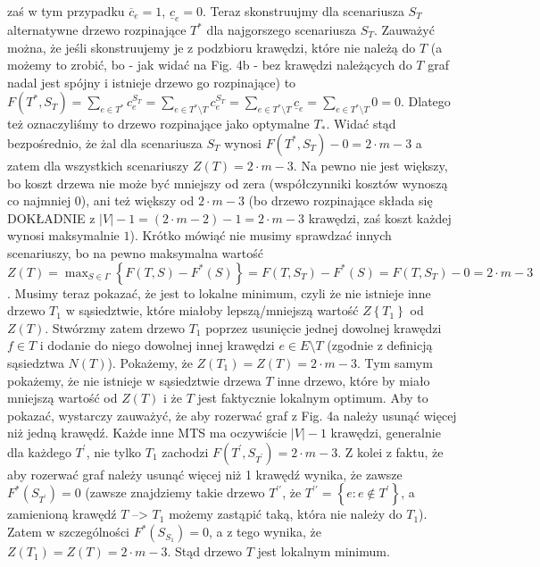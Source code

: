 zaś w tym przypadku $\overline{c}_{e} = 1$, $\underline{c}_{e} = 0$. Teraz skonstruujmy dla scenariusza $S_{T}$ alternatywne drzewo rozpinające $T^{*}$ dla najgorszego scenariusza $S_{T}$. Zauważyć można, że jeśli skonstruujemy je z podzbioru krawędzi, które nie należą do $T$ (a możemy to zrobić, bo - jak widać na Fig. 4b - bez krawędzi należących do $T$ graf nadal jest spójny i istnieje drzewo go rozpinające) to $F \left( T^{\ast} , S_{T} \right) = \sum_{e \in T^{\ast}} c_{e}^{S_{T}} = \sum_{e \in T^{\ast} \setminus T } c_{e}^{S_{T}} = \sum_{e \in T^{\ast} \setminus T } \underline{c}_{e} = \sum_{e \in T^{\ast} \setminus T } 0 = 0$. Dlatego też oznaczyliśmy to drzewo rozpinające jako optymalne $T_{\ast}$. Widać stąd bezpośrednio, że żal dla scenariusza $S_{T}$ wynosi $F \left( T^{\ast} , S_{T} \right) - 0 = 2 \cdot m - 3$ a zatem dla wszystkich scenariuszy $Z \left( T \right) = 2 \cdot m - 3$. Na pewno nie jest większy, bo koszt drzewa nie może być mniejszy od zera (współczynniki kosztów wynoszą co najmniej $0$), ani też większy od $2 \cdot m - 3$ (bo drzewo rozpinające składa się DOKŁADNIE z $\left| V \right| - 1 = \left( 2 \cdot m - 2 \right) - 1 = 2 \cdot m - 3$ krawędzi, zaś koszt każdej wynosi maksymalnie $1$). Krótko mówiąć nie musimy sprawdzać innych scenariuszy, bo na pewno maksymalna wartość $Z \left( T \right) = \max_{S \in \Gamma} \left\{ F \left( T, S \right) - F^{\ast} \left( S \right) \right\} = F \left( T, S_{T} \right) - F^{\ast} \left( S \right) = F \left( T, S_{T} \right) - 0 = 2 \cdot m - 3$. Musimy teraz pokazać, że jest to lokalne minimum, czyli że nie istnieje inne drzewo $T_{1}$ w sąsiedztwie, które miałoby lepszą/mniejszą wartość $Z \left\{ T_{1} \right\}$ od $Z \left( T \right)$. Stwórzmy zatem drzewo $T_{1}$ poprzez usunięcie jednej dowolnej krawędzi $f \in  T$ i dodanie do niego dowolnej innej krawędzi $e \in E \setminus T$ (zgodnie z definicją sąsiedztwa $N \left( T \right)$). Pokażemy, że $Z \left( T_{1} \right) = Z \left( T \right) = 2 \cdot m - 3$. Tym samym pokażemy, że nie istnieje w  sąsiedztwie drzewa $T$ inne drzewo, które by miało mniejszą wartość od $Z \left( T \right)$ i że $T$ jest faktycznie lokalnym optimum. Aby to pokazać, wystarczy zauważyć, że aby rozerwać graf z Fig. 4a należy usunąć więcej niż jedną krawędź. Każde inne MTS ma oczywiście $\left| V \right| - 1$ krawędzi, generalnie dla każdego $T^{\prime}$, nie tylko $T_{1}$ zachodzi $ F \left( T^{\prime} , S_{T^{\prime}} \right) = 2 \cdot m - 3$. Z kolei z faktu, że aby rozerwać graf należy usunąć więcej niż 1 krawędź wynika, że zawsze $F^{\ast} \left( S_{T^{\prime}} \right) = 0$ (zawsze znajdziemy takie drzewo $T^{\prime\prime}$, że $T^{\prime\prime} = \left\{ e : e \notin T^{\prime} \right\}$, a zamienioną krawędź $T$ --> $T_{1}$ możemy zastąpić taką, która nie należy do $T_{1}$). Zatem w szczególności $F^{\ast} \left( S_{S_{1}} \right) = 0$, a z tego wynika, że $Z \left( T_{1} \right) = Z \left( T \right) = 2 \cdot m - 3$. Stąd drzewo $T$ jest lokalnym minimum.

